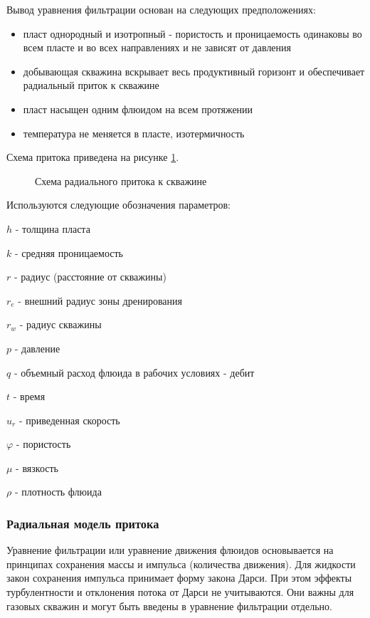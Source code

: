 
Вывод уравнения фильтрации основан на следующих предположениях: 
\begin{itemize}
	\item пласт однородный и изотропный - пористость и проницаемость одинаковы во всем пласте и во всех направлениях и не зависят от давления 
	\item добывающая скважина вскрывает весь продуктивный горизонт и обеспечивает радиальный приток к скважине
	\item пласт насыщен одним флюидом на всем протяжении
	\item температура не меняется в пласте, изотермичность
\end{itemize}

Схема притока приведена на рисунке \ref{ris:radial_inflow_scheme}.

\begin{figure}[h!]
	\begin{center}
		
		\caption{Схема радиального притока к скважине}
		\label{ris:radial_inflow_scheme}
	\end{center}
\end{figure}

Используются следующие обозначения параметров:

\(h\) - толщина пласта

\(k\) - средняя проницаемость

\(r\) - радиус (расстояние от скважины)

\(r_e\) -  внешний радиус зоны дренирования

\(r_w\) - радиус скважины

\(p\) - давление

\(q\) - объемный расход флюида в рабочих условиях - дебит

\(t\) - время

\(u_r\) - приведенная скорость

\(\varphi\) -  пористость

\(\mu\) - вязкость

\(\rho\) - плотность флюида

\subsubsection{Радиальная модель притока}
Уравнение фильтрации или уравнение движения флюидов основывается на принципах сохранения массы и импульса (количества движения). Для жидкости закон сохранения импульса принимает форму закона Дарси. При этом эффекты турбулентности и отклонения потока от Дарси не учитываются. Они важны для газовых скважин и могут быть введены в уравнение фильтрации отдельно. 

